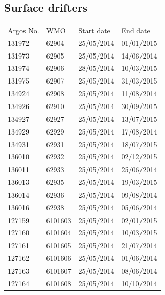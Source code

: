 \documentclass[10pt,landscape]{article}
\begin{document}
\begin{multicols}{2}
\subsection*{Surface drifters}
\begin{table}[H]
\begin{tabular}{llll}
\toprule
Argos No.	&	WMO		& Start date & End date\\
131972		& 	62904	& 25/05/2014	 & 01/01/2015 \\
131973		&	62905	& 25/05/2014	 & 14/06/2014 \\
131974		& 	62906	& 28/05/2014	 & 10/03/2015 \\
131975		& 	62907	& 25/05/2014	 & 31/03/2015 \\
134924		& 	62908	& 25/05/2014	 & 11/08/2014 \\
134926		& 	62910	& 25/05/2014	 & 30/09/2015 \\ 
134927		& 	62927	& 25/05/2014	 & 13/07/2015 \\
134929		& 	62929	& 25/05/2014	 & 17/08/2014 \\
134931		& 	62931	& 25/05/2014	 & 18/07/2015 \\
136010		& 	62932	& 25/05/2014	 & 02/12/2015 \\
136011		& 	62933	& 25/05/2014	 & 25/06/2014 \\
136013		& 	62935	& 25/05/2014	 & 19/03/2015 \\
136014		& 	62936	& 25/05/2014	 & 09/08/2014 \\
136016		& 	62938	& 25/05/2014	 & 05/06/2014 \\
127159		& 	6101603	& 25/05/2014	 & 02/01/2015 \\
127160		& 	6101604	& 25/05/2014	 & 10/03/2015 \\
127161		& 	6101605	& 25/05/2014	 & 21/07/2014 \\
127162		& 	6101606	& 25/05/2014	 & 01/06/2014 \\
127163		& 	6101607	& 25/05/2014	 & 08/06/2014 \\
127164		& 	6101608	& 25/05/2014	 & 10/10/2014 \\
\bottomrule
\end{tabular}
\end{table}

\columnbreak


\end{multicols}
\end{document}

